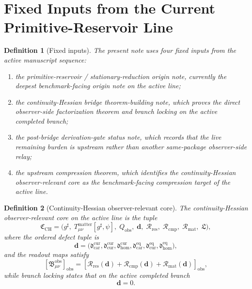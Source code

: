 \documentclass[11pt]{article}
\newcommand{\CompletedMetric}{g^{\sharp}}
\newcommand{\ObserverQuotient}{Q_{\mathrm{obs}}}
\newcommand{\ObsBurden}{\mathfrak B_{\mu\nu}^{\mathrm{obs}}}
\newcommand{\ObserverClass}[1]{\left[#1\right]_{\mathrm{obs}}}
\newcommand{\DefectTuple}{\mathbf d}
\newcommand{\ResidualRead}{\mathscr R_{\mathrm{res}}}
\newcommand{\CompletionRead}{\mathscr R_{\mathrm{cmp}}}
\newcommand{\MatterRead}{\mathscr R_{\mathrm{mat}}}
\newcommand{\BranchLock}{\mathfrak L}
\newcommand{\CoreData}{\mathfrak C_{\mathrm{CH}}}
\newtheorem{definition}{Definition}
\begin{document}
\section{Fixed Inputs from the Current Primitive-Reservoir Line}

\begin{definition}[Fixed inputs]
\label{def:fixed}
The present note uses four fixed inputs from the active manuscript sequence:
\begin{enumerate}
    \item the primitive-reservoir / stationary-reduction origin note, currently the deepest benchmark-facing origin note on the active line;
    \item the continuity-Hessian bridge theorem-building note, which proves the direct observer-side factorization theorem and branch locking on the active completed branch;
    \item the post-bridge derivation-gate status note, which records that the live remaining burden is upstream rather than another same-package observer-side relay;
    \item the upstream compression theorem, which identifies the continuity-Hessian observer-relevant core as the benchmark-facing compression target of the active line.
\end{enumerate}
\end{definition}

\begin{definition}[Continuity-Hessian observer-relevant core]
\label{def:core}
The \emph{continuity-Hessian observer-relevant core} on the active line is the tuple
\[
\CoreData
=
\bigl(
\CompletedMetric,\;
T_{\mu\nu}^{\mathrm{matter}}[\CompletedMetric,\psi],\;
\ObserverQuotient,\;
\DefectTuple,\;
\ResidualRead,\;
\CompletionRead,\;
\MatterRead,\;
\BranchLock
\bigr),
\]
where the ordered defect tuple is
\[
\DefectTuple
=
\bigl(
\mathfrak d_{\mathrm{car}}^{\mathrm{cur}},
\mathfrak d_{\mathrm{cur}}^{\mathrm{cur}},
\mathfrak d_{\mathrm{hom}}^{\mathrm{cur}},
\mathfrak d_{\mathrm{car}}^{\mathrm{eq}},
\mathfrak d_{\mathrm{cur}}^{\mathrm{eq}},
\mathfrak d_{\mathrm{hom}}^{\mathrm{eq}}
\bigr),
\]
and the readout maps satisfy
\begin{equation}
\ObserverClass{\ObsBurden}
=
\ObserverClass{
\ResidualRead(\DefectTuple)
+\CompletionRead(\DefectTuple)
+\MatterRead(\DefectTuple)},
\label{eq:factorization}
\end{equation}
while branch locking states that on the active completed branch
\begin{equation}
\DefectTuple=0.
\label{eq:locking}
\end{equation}
\end{definition}
\end{document}
